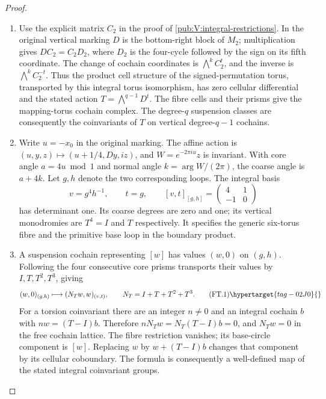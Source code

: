 \begin{proof}
\begin{enumerate}[label={$\langle1\rangle$\arabic*.}]
\item Use the explicit matrix $C_2$ in the proof of
\cref{pub:V:integral-restrictions}.  In the original vertical marking $D$ is the
bottom-right block of $M_2$; multiplication gives
$DC_2=C_2D_2$, where $D_2$ is the four-cycle followed by the sign
on its fifth coordinate.  The change of cochain coordinates is
$\bigwedge^kC_2^t$, and the inverse is $\bigwedge^kC_2^{-t}$.
Thus the product cell structure of the signed-permutation torus,
transported by this integral torus isomorphism, has zero cellular
differential and the stated action $T=\bigwedge^{q-1}D^t$.
The fibre cells and their prisms give the mapping-torus
cochain complex.  The degree-$q$ suspension classes are consequently
the coinvariants of $T$ on vertical degree-$q-1$ cochains.

\item Write $u=-x_0$ in the original marking.  The affine action is
$(u,y,z)\mapsto(u+1/4,Dy,iz)$, and
$W=e^{-2\pi i u}z$ is invariant.  With core angle $a=4u\bmod1$
and normal angle $k=\arg W/(2\pi)$, the coarse angle is $a+4k$.
Let $g,h$ denote the two corresponding loops.  The integral basis
\[
 v=g^4h^{-1},\qquad t=g,
 \qquad [v,t]_{[g,h]}=\begin{pmatrix}4&1\\-1&0\end{pmatrix}
\]
has determinant one.  Its coarse degrees are zero and one; its
vertical monodromies are $T^4=I$ and $T$ respectively.
It specifies the generic six-torus fibre and the primitive
base loop in the boundary product.

\item A suspension cochain representing $[w]$ has values $(w,0)$
on $(g,h)$.  Following the four consecutive core prisms transports
their values by $I,T,T^2,T^3$, giving
\[
 (w,0)_{(g,h)}\longmapsto(N_Tw,w)_{(v,t)},
 \qquad N_T=I+T+T^2+T^3.
 \tag{FT.1}\hypertarget{tag-02J0}{}\label{maps:eq:FT.1}
\]
For a torsion coinvariant there are an integer $n\ne0$ and an
integral cochain $b$ with $nw=(T-I)b$.  Therefore
$nN_Tw=N_T(T-I)b=0$, and $N_Tw=0$ in the free cochain lattice.
The fibre restriction vanishes; its base-circle component is $[w]$.
Replacing $w$ by $w+(T-I)b$ changes that component by its cellular
coboundary.  The formula is consequently a well-defined map of the
stated integral coinvariant groups.


\end{enumerate}
\end{proof}
